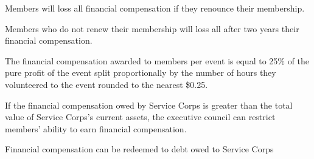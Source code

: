\documentclass{Service_Corps_Document}
\begin{document}
    \def \Title {Financial Compensation}
    \def \Company {Service Corps}
    \def \versionNumber {1.0}
    \stdFooter
    \begin{titlepage}
        \stdTitlePage
    \end{titlepage}

    \tableofcontents

    \newpage
        \item Members will loss all financial compensation if they renounce their membership.
        \item Members who do not renew their membership will loss all after two years their financial compensation.
        \item The financial compensation awarded to members per event is equal to 25\% of the pure profit of the event split proportionally by the number of hours they volunteered to the event rounded to the nearest \$0.25.
        \item If the financial compensation owed by Service Corps is greater than the total value of Service Corps's current assets, the executive council can restrict members' ability to earn financial compensation.
        \item Financial compensation can be redeemed to debt owed to Service Corps
\end{document}
